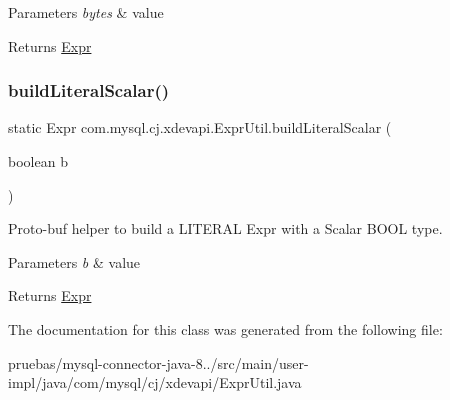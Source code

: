 \begin{DoxyParams}{Parameters}
{\em bytes} & value \\
\hline
\end{DoxyParams}
\begin{DoxyReturn}{Returns}
\mbox{\hyperlink{}{Expr}} 
\end{DoxyReturn}
\mbox{\label{classcom_1_1mysql_1_1cj_1_1xdevapi_1_1_expr_util_a7dd1d131c79981f74e4f33b41e4df40f}} 
\subsubsection{\texorpdfstring{build\+Literal\+Scalar()}{buildLiteralScalar()}\hspace{0.1cm}{\footnotesize\ttfamily [5/5]}}
{\footnotesize\ttfamily static Expr com.\+mysql.\+cj.\+xdevapi.\+Expr\+Util.\+build\+Literal\+Scalar (\begin{DoxyParamCaption}\item[{boolean}]{b }\end{DoxyParamCaption})\hspace{0.3cm}{\ttfamily [static]}}

Proto-\/buf helper to build a L\+I\+T\+E\+R\+AL Expr with a Scalar B\+O\+OL type.


\begin{DoxyParams}{Parameters}
{\em b} & value \\
\hline
\end{DoxyParams}
\begin{DoxyReturn}{Returns}
\mbox{\hyperlink{}{Expr}} 
\end{DoxyReturn}


The documentation for this class was generated from the following file\+:\begin{DoxyCompactItemize}
\item 
pruebas/mysql-\/connector-\/java-\/8../src/main/user-\/impl/java/com/mysql/cj/xdevapi/Expr\+Util.\+java\end{DoxyCompactItemize}
